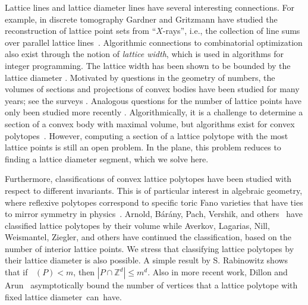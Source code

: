 \documentclass[11pt]{article}
\newcommand{\Z}{\mathbb{Z}}
\newcommand{\N}{\mathbb{N}}
\DeclareMathOperator{\ldiam}{diam_\Z}
\begin{document}
Lattice lines and lattice diameter lines have several interesting connections. For example, in discrete tomography Gardner and Gritzmann have studied the reconstruction of lattice point sets from ``$X$-rays'', i.e., the collection of line sums over parallel lattice lines~\cite{gardnergritzmann97}. Algorithmic connections to combinatorial optimization also exist through the notion of \emph{lattice width}, which is used in algorithms for integer programming. The lattice width has been shown to be bounded by the lattice diameter \cite{Barany_Furedi}. Motivated by questions in the geometry of numbers, the volumes of sections and projections of convex bodies have been studied for many years; see the surveys \cite{giannopoulos2023inequalities, nayar2023extremal}. Analogous questions for the number of lattice points have only been studied more recently \cite{gard05,freyerhenk22,freyerhenk24}. Algorithmically, it is a challenge to determine a section of a convex body with maximal volume, but algorithms exist for convex polytopes~\cite{BDLM}. However, computing a section of a lattice polytope with the most lattice points is still an open problem. In the plane, this problem reduces to finding a lattice diameter segment, which we solve here. 


Furthermore, classifications of convex lattice polytopes have been studied with respect to different invariants. This is of particular interest in algebraic geometry, where reflexive polytopes correspond to specific toric Fano varieties that have ties to mirror symmetry in physics~\cite{batyrev1999classification, kasprzyk2006toric}. Arnold, B\'ar\'any, Pach, Vershik, and others~\cite{arno80, bara92, bara92a} have classified lattice polytopes by their volume while Averkov, Lagarias, Nill, Weismantel, Ziegler, and others \cite{lagariasZiegler1991bounds, averkov2011maximal, nillziegler2011projecting} have continued the classification, based on the number of interior lattice points. We stress that classifying lattice polytopes by their lattice diameter is also possible. A simple result by S. Rabinowitz \cite{rabi89} shows that if $\ldiam(P)<m$, then $|P \cap \Z^d| \leq m^d$.
Also in more recent work, Dillon and Arun~\cite{HollowP} asymptotically bound the number of vertices that a lattice polytope with fixed lattice \mbox{diameter can have.}
\end{document}
